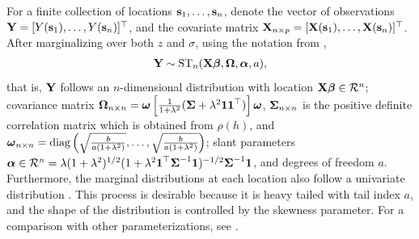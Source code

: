 \documentclass[useAMS,usenatbib,referee]{biom}
\begin{document}
For a finite collection of locations $\mbox{\bf s}_1, \ldots, \mbox{\bf s}_n$, denote the vector of observations $\mbox{\bf Y} = [Y(\mbox{\bf s}_1), \ldots, Y(\mbox{\bf s}_n)]^\top$, and the covariate matrix $\mbox{\bf X}_{n \times p} = [\mbox{\bf X}(\mbox{\bf s}_1), \ldots, \mbox{\bf X}(\mbox{\bf s}_n)]^\top$.
After marginalizing over both $z$ and $\sigma$, using the notation from \citet[p. 176]{Azzalini2014},
\begin{align} \label{steq:stazzalini}
  \bY \sim \text{ST}_n(\bX \bbeta, \bOmega, \balpha, a),
\end{align}
that is, $\mbox{\bf Y}$ follows an $n$-dimensional \skewt distribution with location $\bX \bbeta \in \calR^n$; covariance matrix $\mbox{\boldmath $\Omega$}_{n \times n} = \mbox{\boldmath $\omega$} \left[ \frac{1}{1 + \lambda^2}(\mbox{\boldmath $\Sigma$} + \lambda^2 \mbox{\boldmath $1$} \mbox{\boldmath $1$}^\top) \right] \mbox{\boldmath $\omega$}$, $\mbox{\boldmath $\Sigma$}_{n \times n}$ is the positive definite correlation matrix which is obtained from $\rho(h)$, and $\mbox{\boldmath $\omega$}_{n \times n} = \text{diag}\left(\sqrt{\frac{ b }{a(1 + \lambda^2)}}, \ldots, \sqrt{\frac{ b }{a(1 + \lambda^2)}} \right)$; slant parameters $\balpha \in \calR^n = \lambda (1 + \lambda^2)^{1 / 2} (1 + \lambda^2 \bOne^\top \bSigma^{-1} \bOne)^{-1/2} \bSigma^{-1} \bOne$, and degrees of freedom $a$.
Furthermore, the marginal distributions at each location also follow a univariate \skewt distribution \citep{Azzalini2014}.
This process is desirable because it is heavy tailed with tail index $a$, and the shape of the distribution is controlled by the skewness parameter.
For a comparison with other parameterizations, see .

\end{document}
